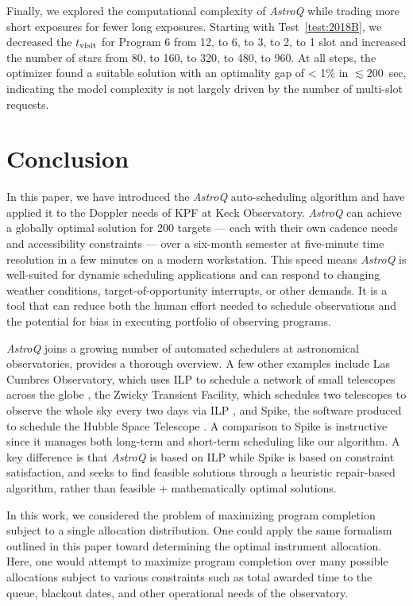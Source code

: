 \documentclass[twocolumn,linenumbers]{aastex63}
\newcommand{\AstroQ}{\textit{AstroQ}\xspace}
\newcommand{\isr}[2]{\ensuremath{#1_{\rm #2}}\xspace}
\begin{document}
Finally, we explored the computational complexity of \AstroQ while trading more short exposures for fewer long exposures. Starting with Test~\ref{test:2018B}, we decreased the \isr{t}{visit} for Program 6 from 12, to 6, to 3, to 2, to 1 slot and increased the number of stars from 80, to 160, to 320, to 480, to 960. At all steps, the optimizer found a suitable solution with an optimality gap of < 1\% in $\lesssim200$~sec, indicating the model complexity is not largely driven by the number of multi-slot requests.

\section{Conclusion}
\label{sec:conclusion}

In this paper, we have introduced the \AstroQ auto-scheduling algorithm and have applied it to the Doppler needs of KPF at Keck Observatory. \AstroQ can achieve a globally optimal solution for 200 targets --- each with their own cadence needs and accessibility constraints --- over a six-month semester at five-minute time resolution in a few minutes on a modern workstation. This speed means \AstroQ is well-suited for dynamic scheduling applications and can respond to changing weather conditions, target-of-opportunity interrupts, or other demands. It is a tool that can reduce both the human effort needed to schedule observations and the potential for bias in executing portfolio of observing programs. 

\AstroQ joins a growing number of automated schedulers at astronomical observatories, \citet{Bellm2019b} provides a thorough overview. A few other examples include Las Cumbres Observatory, which uses ILP to schedule a network of small telescopes across the globe \citep{Lampoudi2015}, the Zwicky Transient Facility, which schedules two telescopes to observe the whole sky every two days via ILP \citep{Bellm2019a}, and Spike, the software produced to schedule the Hubble Space Telescope \citep{Johnston1990}. A comparison to Spike is instructive since it manages both long-term and short-term scheduling like our algorithm. A key difference is that \AstroQ is based on ILP while Spike is based on constraint satisfaction, and seeks to find feasible solutions through a heuristic repair-based algorithm, rather than feasible + mathematically optimal solutions.

In this work, we considered the problem of maximizing program completion subject to a single allocation distribution. One could apply the same formalism outlined in this paper toward determining the optimal instrument allocation. Here, one would attempt to maximize program completion over many possible allocations subject to various constraints such as total awarded time to the queue, blackout dates, and other operational needs of the observatory. 
\end{document}

